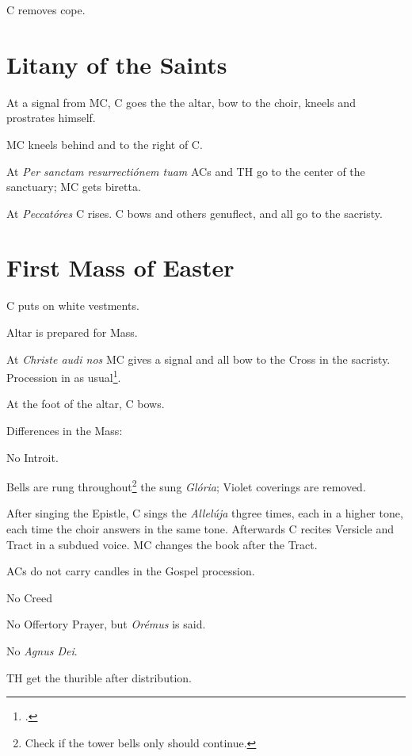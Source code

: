 {\rubric C removes cope.

\section{Litany of the Saints}

\rubric At a signal from MC, C goes the the altar, bow to the choir, kneels and
prostrates himself.

\rubric MC kneels behind and to the right of C.

\rubric At \textit{Per sanctam resurrectiónem tuam} ACs and TH go to the center
of the sanctuary; MC gets biretta.

\rubric At \textit{Peccatóres} C rises. C bows and others genuflect, and
all go to the sacristy.

\section{First Mass of Easter}

\rubric C puts on white vestments.

\rubric Altar is prepared for Mass.

\rubric At \textit{Christe audi nos} MC gives a signal and all bow to the Cross
in the sacristy. Procession in as usual\footcite[If the baptismal font was
blessed, the AC's candles are already on the credence table; if the font was
not blessed, the ACs carry them.][footnote, p. 233]{hweekls}.

\rubric At the foot of the altar, C bows.

\rubric Differences in the Mass:

\rubric No Introit.

\rubric Bells are rung throughout\footnote{Check if the tower bells only should
continue.} the sung \textit{Glória}; Violet coverings are removed.

\rubric After singing the Epistle, C sings the \textit{Allelúja} thgree times,
each in a higher tone, each time the choir answers in the same tone. Afterwards
C recites Versicle and Tract in a subdued voice. MC changes the book after the
Tract.

\rubric ACs do not carry candles in the Gospel procession.

\rubric No Creed

\rubric No Offertory Prayer, but \textit{Orémus} is said.

\rubric No \textit{Agnus Dei}.

\rubric TH get the thurible after distribution.

}
